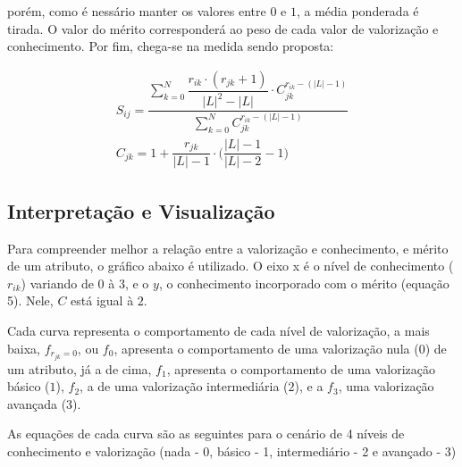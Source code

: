 \documentclass[]{article}
\begin{document}
	
	porém, como é nessário manter os valores entre $0$ e $1$, a média ponderada é tirada. O valor do mérito corresponderá ao peso de cada valor de valorização e conhecimento. Por fim, chega-se na medida sendo proposta:
	
	\begin{center}
		\begin{equation}
			  \begin{multlined}
				S_{ij} = \dfrac{\sum_{k = 0}^N \dfrac{r_{ik}\cdot(r_{jk} + 1)}{|L|^2 - |L|} \cdot C_{jk}^{r_{ik} - (|L| - 1)}}{\sum_{k = 0}^N C_{jk}^{r_{ik} - (|L| - 1)}} \\
				C_{jk} = 1 + \dfrac{r_{jk}}{|L| - 1} \cdot \bigg(\dfrac{|L| - 1}{|L| - 2} - 1\bigg)
			  \end{multlined}
		\end{equation}	
	\end{center}
	
	\subsection{Interpretação e Visualização}
	
	Para compreender melhor a relação entre a valorização e conhecimento, e mérito de um atributo, o gráfico abaixo é utilizado. O eixo x é o nível de conhecimento ($r_{ik}$) variando de $0$ à $3$, e o $y$, o conhecimento incorporado com o mérito (equação 5). Nele, $C$ está igual à $2$.
	
	Cada curva representa o comportamento de cada nível de valorização, a mais baixa, $f_{r_{jk} = 0}$, ou $f_0$, apresenta o comportamento de uma valorização nula ($0$) de um atributo, já a de cima, $f_1$, apresenta o comportamento de uma valorização básico ($1$), $f_2$, a de uma valorização intermediária ($2$), e a $f_3$, uma valorização avançada ($3$).
	
	As equações de cada curva são as seguintes para o cenário de 4 níveis de conhecimento e valorização (nada - 0, básico - 1, intermediário - 2 e avançado - 3)
	
\end{document}
